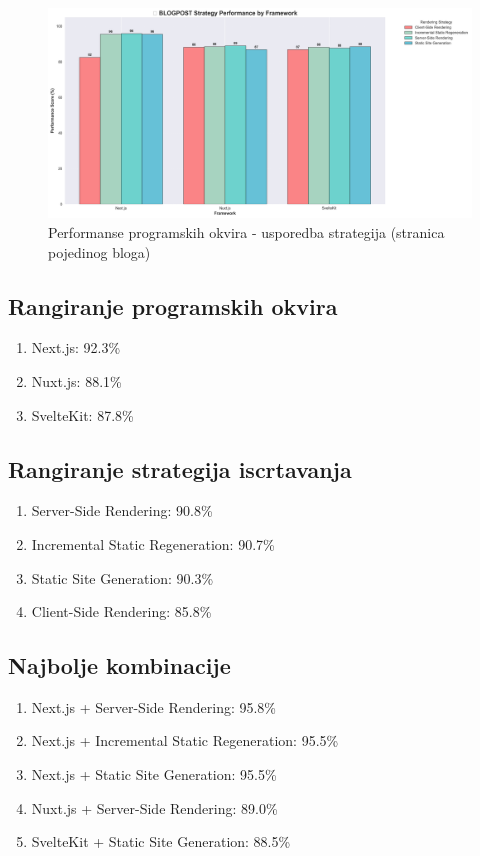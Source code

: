 \begin{figure}[H]
    \centering
    \includegraphics[width=\textwidth]{slike/rezultati/blog-post/blogPost_strategy_comparison.png}
    \caption{Performanse programskih okvira - usporedba strategija (stranica pojedinog bloga) }
    \label{fig:testiranje-blog-post-usporedba-strategija}
\end{figure}

\newpage
\subsection{Rangiranje programskih okvira}
\begin{enumerate}
    \item Next.js: 92.3\%
    \item Nuxt.js: 88.1\%
    \item SvelteKit: 87.8\%
\end{enumerate}

\subsection{Rangiranje strategija iscrtavanja}
\begin{enumerate}
    \item Server-Side Rendering: 90.8\%
    \item Incremental Static Regeneration: 90.7\%
    \item Static Site Generation: 90.3\%
    \item Client-Side Rendering: 85.8\%
\end{enumerate}

\subsection{Najbolje kombinacije}
\begin{enumerate}
    \item Next.js + Server-Side Rendering: 95.8\%
    \item Next.js + Incremental Static Regeneration: 95.5\%
    \item Next.js + Static Site Generation: 95.5\%
    \item Nuxt.js + Server-Side Rendering: 89.0\%
    \item SvelteKit + Static Site Generation: 88.5\%
\end{enumerate}

